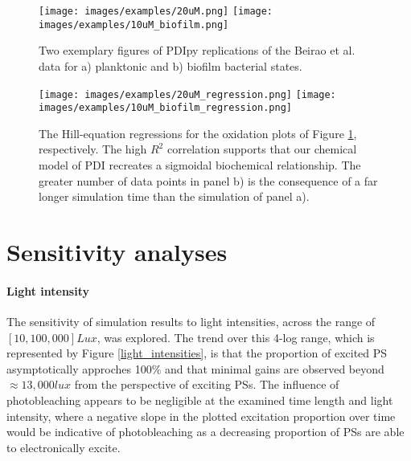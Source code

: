\begin{figure}
    \centering
    \texttt{[image: images/examples/20uM.png]}
    \vspace{5mm}
    \midrule
    \vspace{5mm}
    \texttt{[image: images/examples/10uM\_biofilm.png]}
    \caption{
        Two exemplary figures of PDIpy replications of the Beirao et al. data for a) planktonic and b) biofilm bacterial states.
    }
    \label{beirao_et_al}
\end{figure}

\begin{figure}
    \centering
    \texttt{[image: images/examples/20uM\_regression.png]}
    \vspace{5mm}
    \midrule
    \vspace{5mm}
    \texttt{[image: images/examples/10uM\_biofilm\_regression.png]}
    \caption{
        The Hill-equation regressions for the oxidation plots of Figure \ref{beirao_et_al}, respectively. The high $R^2$ correlation supports that our chemical model of PDI recreates a sigmoidal biochemical relationship. The greater number of data points in panel b) is the consequence of a far longer simulation time than the simulation of panel a).
    }
    \label{hill_regression}
\end{figure}


\section{Sensitivity analyses}

\paragraph{Light intensity}
The sensitivity of simulation results to light intensities, across the range of $[10, 100,000] Lux$, was explored. The trend over this 4-log range, which is represented by Figure \ref{light_intensities}, is that the proportion of excited PS asymptotically approches 100\% and that minimal gains are observed beyond $\approx 13,000 lux$ from the perspective of exciting PSs. The influence of photobleaching appears to be negligible at the examined time length and light intensity, where a negative slope in the plotted excitation proportion over time would be indicative of photobleaching as a decreasing proportion of PSs are able to electronically excite.

